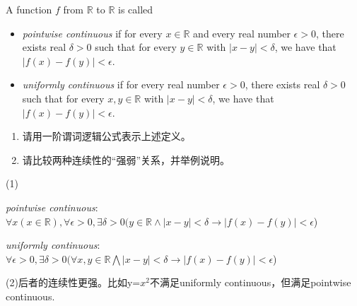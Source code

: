 \documentclass[a4paper, justified]{tufte-handout}
\begin{document}
\begin{problem}
A function $f$ from $\mathbb{R}$ to $\mathbb{R}$ is called
\begin{itemize}
  \item \emph{pointwise continuous} if
        for every $x \in \mathbb{R}$
        and every real number $\epsilon > 0$,
        there exists real $\delta > 0$ such that
        for every $y \in \mathbb{R}$ with $|x - y| < \delta$,
        we have that $|f(x) -  f(y)|< \epsilon$.
  \item \emph{uniformly continuous} if
        for every real number $\epsilon > 0$,
        there exists real $\delta > 0$ such that
        for every $x, y \in \mathbb{R}$ with $|x - y| < \delta$,
        we have that $|f(x) -  f(y)|< \epsilon$.
\end{itemize}

\begin{enumerate}[(1)]
  \item 请用一阶谓词逻辑公式表示上述定义。
  \item 请比较两种连续性的``强弱''关系，并举例说明。
\end{enumerate}
\end{problem}

\begin{solution}

  (1)\item \emph{pointwise continuous}:$\forall x(x \in \mathbb{R}),\forall \epsilon >0,\exists \delta >0 (y \in \mathbb{R}\land  |x - y| < \delta \rightarrow |f(x) -  f(y)|< \epsilon$)

  \item \emph{uniformly continuous}:$\forall \epsilon>0,\exists \delta >0(\forall x, y \in \mathbb{R}\bigwedge |x - y| < \delta\rightarrow |f(x) -  f(y)|< \epsilon$)

  (2)后者的连续性更强。比如y=$x^2$不满足uniformly continuous，但满足pointwise continuous.
\end{solution}

\begin{problem}
\end{problem}
\end{document}
